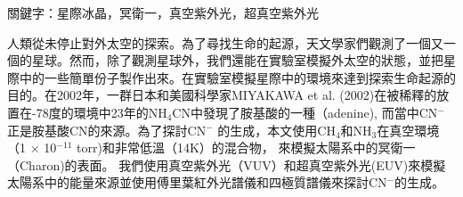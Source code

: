 \begin{abstractcn}

關鍵字：星際冰晶，冥衛一，真空紫外光，超真空紫外光
\vspace{2em}

人類從未停止對外太空的探索。為了尋找生命的起源，天文學家們觀測了一個又一個的星球。然而，除了觀測星球外，我們還能在實驗室模擬外太空的狀態，並把星際中的一些簡單份子製作出來。在實驗室模擬星際中的環境來達到探索生命起源的目的。在2002年，一群日本和美國科學家MIYAKAWA et al. (2002)\cite{miyakawa2002cold}在被稀釋的放置在-78度的環境中23年的NH$_4$CN中發現了胺基酸的一種（adenine), 而當中CN$^-$正是胺基酸CN的來源。為了探討CN$^-$ 的生成，本文使用CH$_4$和NH$_3$在真空環境（1 $\times$ 10$^{-11}$ torr)和非常低溫（14K）的混合物， 來模擬太陽系中的冥衛一（Charon)的表面。 我們使用真空紫外光（VUV）和超真空紫外光(EUV)來模擬太陽系中的能量來源並使用傅里葉紅外光譜儀和四極質譜儀來探討CN$^-$的生成。

\end{abstractcn} 
